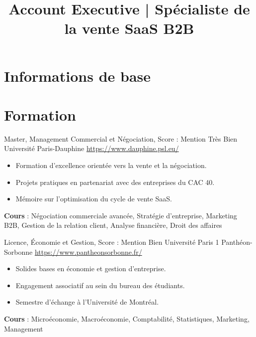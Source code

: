 \documentclass[a4paper, serif, 10pt]{moderncv}
\title{Account Executive | Spécialiste de la vente SaaS B2B}
\begin{document}
\maketitle

\section{Informations de base}

\section{Formation}

        {Master, Management Commercial et Négociation, Score : Mention Très Bien}
        {Université Paris-Dauphine}
        {\url{https://www.dauphine.psl.eu/}}
        {}
        {\begin{itemize}
\item Formation d'excellence orientée vers la vente et la négociation.
\item Projets pratiques en partenariat avec des entreprises du CAC 40.
\item Mémoire sur l'optimisation du cycle de vente SaaS.
\end{itemize}
\textbf{Cours} : Négociation commerciale avancée, Stratégie d'entreprise, Marketing B2B, Gestion de la relation client, Analyse financière, Droit des affaires}

        {Licence, Économie et Gestion, Score : Mention Bien}
        {Université Paris 1 Panthéon-Sorbonne}
        {\url{https://www.pantheonsorbonne.fr/}}
        {}
        {\begin{itemize}
\item Solides bases en économie et gestion d'entreprise.
\item Engagement associatif au sein du bureau des étudiants.
\item Semestre d'échange à l'Université de Montréal.
\end{itemize}
\textbf{Cours} : Microéconomie, Macroéconomie, Comptabilité, Statistiques, Marketing, Management}
\end{document}
